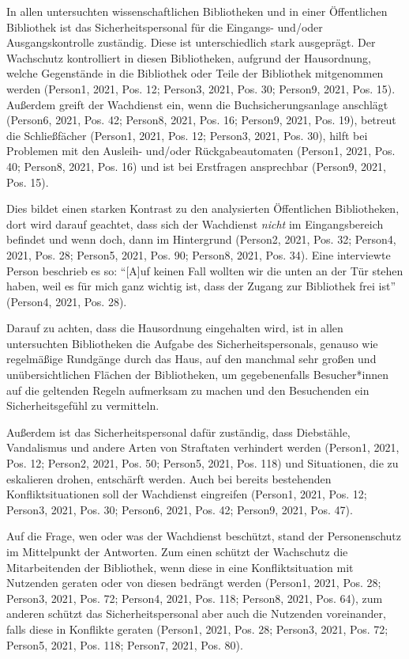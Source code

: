 \documentclass[a4paper,
fontsize=11pt,
oneside,
numbers=noperiodatend,
parskip=half-,
bibliography=totoc,
final
]{scrartcl}
\begin{document}
In allen untersuchten wissenschaftlichen Bibliotheken und in einer
Öffentlichen Bibliothek ist das Sicherheitspersonal für die Eingangs-
und/oder Ausgangskontrolle zuständig. Diese ist unterschiedlich stark
ausgeprägt. Der Wachschutz kontrolliert in diesen Bibliotheken, aufgrund
der Hausordnung, welche Gegenstände in die Bibliothek oder Teile der
Bibliothek mitgenommen werden (Person1, 2021, Pos. 12; Person3, 2021,
Pos. 30; Person9, 2021, Pos. 15). Außerdem greift der Wachdienst ein,
wenn die Buchsicherungsanlage anschlägt (Person6, 2021, Pos. 42;
Person8, 2021, Pos. 16; Person9, 2021, Pos. 19), betreut die
Schließfächer (Person1, 2021, Pos. 12; Person3, 2021, Pos. 30), hilft
bei Problemen mit den Ausleih- und/oder Rückgabeautomaten (Person1,
2021, Pos. 40; Person8, 2021, Pos. 16) und ist bei Erstfragen
ansprechbar (Person9, 2021, Pos. 15).

Dies bildet einen starken Kontrast zu den analysierten Öffentlichen
Bibliotheken, dort wird darauf geachtet, dass sich der Wachdienst
\emph{nicht} im Eingangsbereich befindet und wenn doch, dann im
Hintergrund (Person2, 2021, Pos. 32; Person4, 2021, Pos. 28; Person5,
2021, Pos. 90; Person8, 2021, Pos. 34). Eine interviewte Person
beschrieb es so: \enquote{{[}A{]}uf keinen Fall wollten wir die unten an
der Tür stehen haben, weil es für mich ganz wichtig ist, dass der Zugang
zur Bibliothek frei ist} (Person4, 2021, Pos. 28).

Darauf zu achten, dass die Hausordnung eingehalten wird, ist in allen
untersuchten Bibliotheken die Aufgabe des Sicherheitspersonals, genauso
wie regelmäßige Rundgänge durch das Haus, auf den manchmal sehr großen
und unübersichtlichen Flächen der Bibliotheken, um gegebenenfalls
Besucher*innen auf die geltenden Regeln aufmerksam zu machen und den
Besuchenden ein Sicherheitsgefühl zu vermitteln.

Außerdem ist das Sicherheitspersonal dafür zuständig, dass Diebstähle,
Vandalismus und andere Arten von Straftaten verhindert werden (Person1,
2021, Pos. 12; Person2, 2021, Pos. 50; Person5, 2021, Pos. 118) und
Situationen, die zu eskalieren drohen, entschärft werden. Auch bei
bereits bestehenden Konfliktsituationen soll der Wachdienst eingreifen
(Person1, 2021, Pos. 12; Person3, 2021, Pos. 30; Person6, 2021, Pos. 42;
Person9, 2021, Pos. 47).

Auf die Frage, wen oder was der Wachdienst beschützt, stand der
Personenschutz im Mittelpunkt der Antworten. Zum einen schützt der
Wachschutz die Mitarbeitenden der Bibliothek, wenn diese in eine
Konfliktsituation mit Nutzenden geraten oder von diesen bedrängt werden
(Person1, 2021, Pos. 28; Person3, 2021, Pos. 72; Person4, 2021, Pos.
118; Person8, 2021, Pos. 64), zum anderen schützt das
Sicherheitspersonal aber auch die Nutzenden voreinander, falls diese in
Konflikte geraten (Person1, 2021, Pos. 28; Person3, 2021, Pos. 72;
Person5, 2021, Pos. 118; Person7, 2021, Pos. 80).
\end{document}
